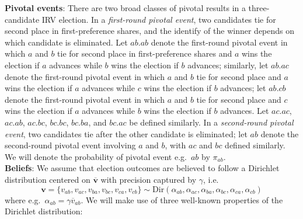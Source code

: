 \documentclass[11pt,a4paper]{article}
\begin{document}
\noindent \textbf{Pivotal events}: There are two broad classes of pivotal results in a three-candidate IRV election. %
In a \emph{first-round pivotal event}, two candidates tie for second place in first-preference shares, and the identify of the winner depends on which candidate is eliminated. Let $ab.ab$ denote the first-round pivotal event in which $a$ and $b$ tie for second place in first-preference shares and $a$ wins the election if $a$ advances while $b$ wins the election if $b$ advances; similarly, let $ab.ac$ denote the first-round pivotal event in which $a$ and $b$ tie for second place and $a$ wins the election if $a$ advances while $c$ wins the election if $b$ advances; let $ab.cb$ denote the first-round pivotal event in which $a$ and $b$ tie for second place and $c$ wins the election if $a$ advances while $b$ wins the election if $b$ advances. Let $ac.ac$, $ac.ab$, $ac.bc$, $bc.bc$, $bc.ba$, and $bc.ac$ be defined similarly.  In a \emph{second-round pivotal event}, two candidates tie after the other candidate is eliminated; let $ab$ denote the second-round pivotal event involving $a$ and $b$, with $ac$ and $bc$ defined similarly. We will denote the probability of pivotal event e.g.\ $ab$ by $\pi_{ab}$.\\

\noindent \textbf{Beliefs}: We assume that election outcomes are believed to follow a Dirichlet distribution centered on $\overline{\mathbf{v}}$ with precision captured by $\gamma$, i.e.\ 
\begin{equation}
\mathbf{v} = \{v_{ab}, v_{ac}, v_{ba}, v_{bc}, v_{ca}, v_{cb} \} \sim \mathrm{Dir}(\alpha_{ab}, \alpha_{ac}, \alpha_{ba}, \alpha_{bc}, \alpha_{ca}, \alpha_{cb})  \label{dirichlet}
\end{equation}
where e.g.\ $\alpha_{ab} = \gamma \overline{v}_{ab}$. We will make use of three well-known \citep{frigyik2010introduction} properties of the Dirichlet distribution:


\smallskip
\end{document}
